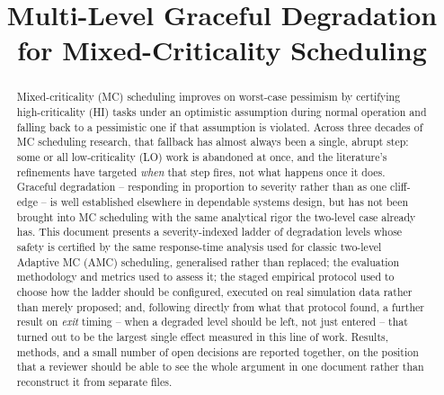 \documentclass{article}
\title{Multi-Level Graceful Degradation for Mixed-Criticality Scheduling}
\author{}
\date{}
\begin{document}
\maketitle

\begin{center}
\end{center}

\begin{abstract}
Mixed-criticality (MC) scheduling improves on worst-case pessimism by certifying
high-criticality (HI) tasks under an optimistic assumption during normal operation and falling
back to a pessimistic one if that assumption is violated. Across three decades of MC scheduling
research, that fallback has almost always been a single, abrupt step: some or all
low-criticality (LO) work is abandoned at once, and the literature's refinements have targeted
\emph{when} that step fires, not what happens once it does. Graceful degradation -- responding
in proportion to severity rather than as one cliff-edge -- is well established elsewhere in
dependable systems design, but has not been brought into MC scheduling with the same analytical
rigor the two-level case already has. This document presents a severity-indexed ladder of
degradation levels whose safety is certified by the same response-time analysis used for
classic two-level Adaptive MC (AMC) scheduling, generalised rather than replaced; the
evaluation methodology and metrics used to assess it; the staged empirical protocol used to
choose how the ladder should be configured, executed on real simulation data rather than merely
proposed; and, following directly from what that protocol found, a further result on \emph{exit}
timing -- when a degraded level should be left, not just entered -- that turned out to be the
largest single effect measured in this line of work. Results, methods, and a small number of
open decisions are reported together, on the position that a reviewer should be able to see
the whole argument in one document rather than reconstruct it from separate files.
\end{abstract}
\end{document}

